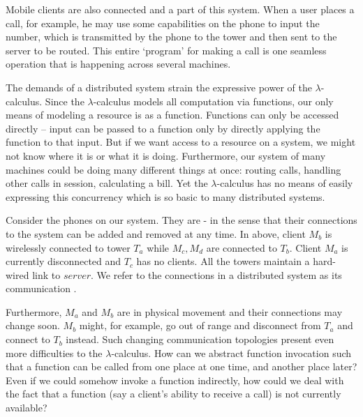 Mobile clients are also connected and a part of this system.  
When a user places a call, for example, he may use some capabilities on the phone to input the number, which is transmitted by the phone to the tower and then sent to the server to be routed.  
This entire `program' for making a call is one seamless operation that is happening across several machines.  

The demands of a distributed system strain the expressive power of the $\lambda$-calculus.  
Since the $\lambda$-calculus models all computation via functions, our only means of modeling a resource is as a function.  
Functions can only be accessed directly -- input can be passed to a function only by directly applying the function to that input.  
But if we want access to a resource on a system, we might not know where it is or what it is doing.  
Furthermore, our system of many machines could be doing many different things at once: routing calls, handling other calls in session, calculating a bill.  
Yet the $\lambda$-calculus has no means of easily expressing this concurrency which is so basic to many distributed systems.

Consider the phones on our system.  
They are - in the sense that their connections to the system can be added and removed at any time.  
In  above, client $M_b$ is wirelessly connected to tower $T_a$ while $M_c,M_d$ are connected to $T_b$.  
Client $M_a$ is currently disconnected and $T_c$ has no clients.  
All the towers maintain a hard-wired link to $server$.  
We refer to the connections in a distributed system as its communication .

Furthermore, $M_a$ and $M_b$ are in physical movement and their connections may change soon.  
$M_b$ might, for example, go out of range and disconnect from $T_a$ and connect to $T_b$ instead.  
Such changing communication topologies present even more difficulties to the $\lambda$-calculus.  
How can we abstract function invocation such that a function can be called from one place at one time, and another place later?  Even if we could somehow invoke a function indirectly, how could we deal with the fact that a function (say a client's ability to receive a call) is not currently available?

